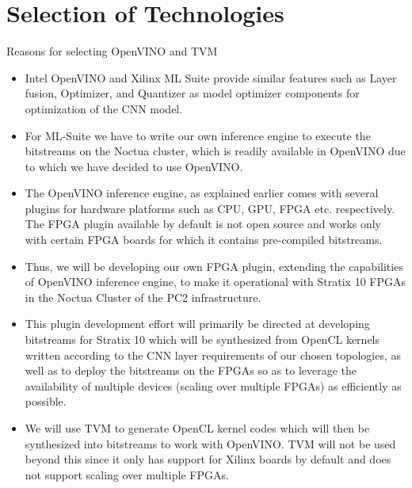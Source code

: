 \documentclass[titlepage]{report}
\begin{document}
 \section{Selection of Technologies}
Reasons for selecting OpenVINO and TVM
 \begin{itemize}
 \item Intel OpenVINO and Xilinx ML Suite provide similar features such as Layer fusion, Optimizer, and Quantizer as model optimizer components for optimization of the CNN model. 
 \item For ML-Suite we have to write our own inference engine  to execute the bitstreams on the Noctua cluster, which is readily available in OpenVINO due to which we have decided to use OpenVINO.
 \item The OpenVINO inference engine, as explained earlier comes with several plugins for hardware platforms such as CPU, GPU, FPGA etc. respectively. The FPGA plugin available by default is not open source and works only with certain FPGA boards for which it contains pre-compiled bitstreams. 
 \item Thus, we will be developing our own FPGA plugin, extending the capabilities of OpenVINO inference engine, to make it operational with Stratix 10 FPGAs in the Noctua Cluster of the PC2 infrastructure. 
 \item This plugin development effort will primarily be directed at developing bitstreams for Stratix 10 which will be synthesized from OpenCL kernels written according to the CNN layer requirements of our chosen topologies, as well as to deploy the bitstreams on the FPGAs so as to leverage the availability of multiple devices (scaling over multiple FPGAs) as efficiently as possible.    
 \item We will use TVM to generate OpenCL kernel codes which will then be synthesized into bitstreams to work with OpenVINO. TVM will not be used beyond this since it only has support for Xilinx boards by default and does not support scaling over multiple FPGAs.

 \end{itemize}
 \pagebreak
\end{document}
